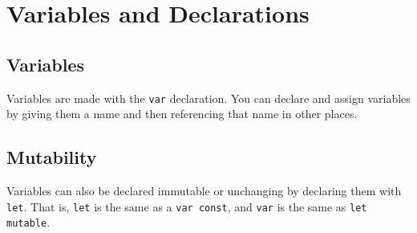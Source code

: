 \section{Variables and Declarations}

\subsection{Variables}

Variables are made with the \lstinline|var| declaration. You can declare and assign variables by giving them a name and then referencing that name in other places.



\subsection{Mutability}

Variables can also be declared immutable or unchanging by declaring them with \lstinline|let|. That is, \lstinline|let| is the same as a \lstinline|var const|, and \lstinline|var| is the same as \lstinline|let mutable|.


